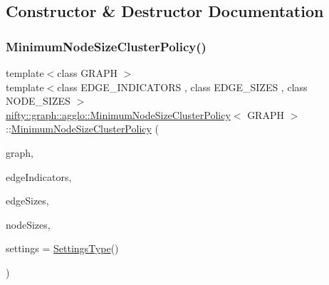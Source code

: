 \subsection{Constructor \& Destructor Documentation}
\mbox{\label{classnifty_1_1graph_1_1agglo_1_1MinimumNodeSizeClusterPolicy_a560b4f00ebeb74357401ba641fef6aea}} 
\subsubsection{\texorpdfstring{Minimum\+Node\+Size\+Cluster\+Policy()}{MinimumNodeSizeClusterPolicy()}}
{\footnotesize\ttfamily template$<$class G\+R\+A\+PH $>$ \\
template$<$class E\+D\+G\+E\+\_\+\+I\+N\+D\+I\+C\+A\+T\+O\+RS , class E\+D\+G\+E\+\_\+\+S\+I\+Z\+ES , class N\+O\+D\+E\+\_\+\+S\+I\+Z\+ES $>$ \\
\hyperlink{classnifty_1_1graph_1_1agglo_1_1MinimumNodeSizeClusterPolicy}{nifty\+::graph\+::agglo\+::\+Minimum\+Node\+Size\+Cluster\+Policy}$<$ G\+R\+A\+PH $>$\+::\hyperlink{classnifty_1_1graph_1_1agglo_1_1MinimumNodeSizeClusterPolicy}{Minimum\+Node\+Size\+Cluster\+Policy} (\begin{DoxyParamCaption}\item[{const \hyperlink{classnifty_1_1graph_1_1agglo_1_1MinimumNodeSizeClusterPolicy_a6d81a64ca67c9feec052a031552282f0}{Graph\+Type} \&}]{graph,  }\item[{const E\+D\+G\+E\+\_\+\+I\+N\+D\+I\+C\+A\+T\+O\+RS \&}]{edge\+Indicators,  }\item[{const E\+D\+G\+E\+\_\+\+S\+I\+Z\+ES \&}]{edge\+Sizes,  }\item[{const N\+O\+D\+E\+\_\+\+S\+I\+Z\+ES \&}]{node\+Sizes,  }\item[{const \hyperlink{structnifty_1_1graph_1_1agglo_1_1MinimumNodeSizeClusterPolicy_1_1SettingsType}{Settings\+Type} \&}]{settings = {\ttfamily \hyperlink{structnifty_1_1graph_1_1agglo_1_1MinimumNodeSizeClusterPolicy_1_1SettingsType}{Settings\+Type}()} }\end{DoxyParamCaption})\hspace{0.3cm}{\ttfamily [inline]}}



